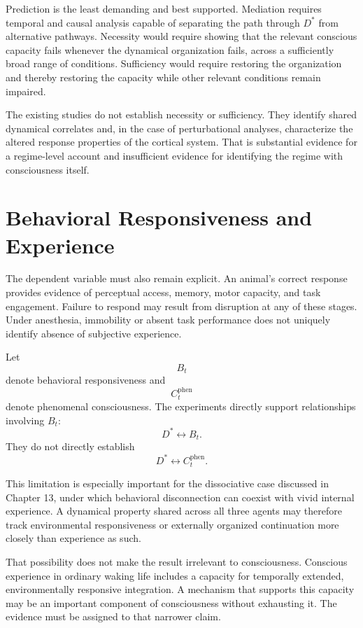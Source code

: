 \documentclass[11pt]{book}
\begin{document}
Prediction is the least demanding and best supported. Mediation requires temporal and causal analysis capable of separating the path through $D^{*}$ from alternative pathways. Necessity would require showing that the relevant conscious capacity fails whenever the dynamical organization fails, across a sufficiently broad range of conditions. Sufficiency would require restoring the organization and thereby restoring the capacity while other relevant conditions remain impaired.

The existing studies do not establish necessity or sufficiency. They identify shared dynamical correlates and, in the case of perturbational analyses, characterize the altered response properties of the cortical system. That is substantial evidence for a regime-level account and insufficient evidence for identifying the regime with consciousness itself.

\section*{Behavioral Responsiveness and Experience}

The dependent variable must also remain explicit. An animal's correct response provides evidence of perceptual access, memory, motor capacity, and task engagement. Failure to respond may result from disruption at any of these stages. Under anesthesia, immobility or absent task performance does not uniquely identify absence of subjective experience.

Let
\[
B_t
\]
denote behavioral responsiveness and
\[
C_t^{\mathrm{phen}}
\]
denote phenomenal consciousness. The experiments directly support relationships involving $B_t$:
\[
D^{*}\longleftrightarrow B_t.
\]
They do not directly establish
\[
D^{*}\longleftrightarrow C_t^{\mathrm{phen}}.
\]

This limitation is especially important for the dissociative case discussed in Chapter 13, under which behavioral disconnection can coexist with vivid internal experience. A dynamical property shared across all three agents may therefore track environmental responsiveness or externally organized continuation more closely than experience as such.

That possibility does not make the result irrelevant to consciousness. Conscious experience in ordinary waking life includes a capacity for temporally extended, environmentally responsive integration. A mechanism that supports this capacity may be an important component of consciousness without exhausting it. The evidence must be assigned to that narrower claim.
\end{document}
